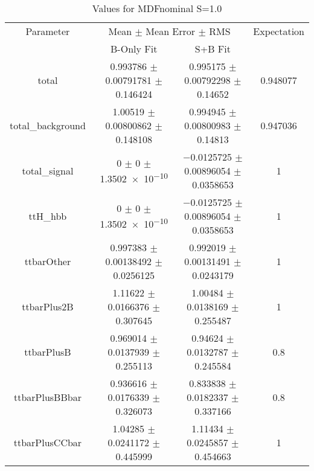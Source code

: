 \begin{table}
\centering
\caption{Values for MDFnominal S=1.0}
\begin{tabular}{cccc}
\toprule
Parameter & \multicolumn{2}{c}{Mean $\pm$ Mean Error $\pm$ RMS} & Expectation\\
 & B-Only Fit & S+B Fit & \\
\midrule
total & \num{0.993786} $\pm$ \num{0.00791781} $\pm$ \num{0.146424} & \num{0.995175} $\pm$ \num{0.00792298} $\pm$ \num{0.14652} & \num{0.948077}\\
total\_background & \num{1.00519} $\pm$ \num{0.00800862} $\pm$ \num{0.148108} & \num{0.994945} $\pm$ \num{0.00800983} $\pm$ \num{0.14813} & \num{0.947036}\\
total\_signal & \num{0} $\pm$ \num{0} $\pm$ \num{1.3502e-10} & \num{-0.0125725} $\pm$ \num{0.00896054} $\pm$ \num{0.0358653} & \num{1}\\
ttH\_hbb & \num{0} $\pm$ \num{0} $\pm$ \num{1.3502e-10} & \num{-0.0125725} $\pm$ \num{0.00896054} $\pm$ \num{0.0358653} & \num{1}\\
ttbarOther & \num{0.997383} $\pm$ \num{0.00138492} $\pm$ \num{0.0256125} & \num{0.992019} $\pm$ \num{0.00131491} $\pm$ \num{0.0243179} & \num{1}\\
ttbarPlus2B & \num{1.11622} $\pm$ \num{0.0166376} $\pm$ \num{0.307645} & \num{1.00484} $\pm$ \num{0.0138169} $\pm$ \num{0.255487} & \num{1}\\
ttbarPlusB & \num{0.969014} $\pm$ \num{0.0137939} $\pm$ \num{0.255113} & \num{0.94624} $\pm$ \num{0.0132787} $\pm$ \num{0.245584} & \num{0.8}\\
ttbarPlusBBbar & \num{0.936616} $\pm$ \num{0.0176339} $\pm$ \num{0.326073} & \num{0.833838} $\pm$ \num{0.0182337} $\pm$ \num{0.337166} & \num{0.8}\\
ttbarPlusCCbar & \num{1.04285} $\pm$ \num{0.0241172} $\pm$ \num{0.445999} & \num{1.11434} $\pm$ \num{0.0245857} $\pm$ \num{0.454663} & \num{1}\\
\bottomrule
\end{tabular}
\end{table}